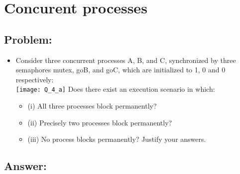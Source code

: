 \newpage
\section{Concurent processes}
\subsection{Problem:}
\begin{itemize}
    \item Consider three concurrent processes A, B, and C, synchronized by three semaphores mutex, goB, and goC, which are initialized to 1, 0 and 0 respectively: \\
        \texttt{[image: Q\_4\_a]}
        Does there exist an execution scenario in which:
        \begin{itemize}
            \item (i) All three processes block permanently?
            \item (ii) Precisely two processes block permanently?
            \item  (iii) No process blocks permanently?
            Justify your answers.
        \end{itemize}
\end{itemize}

\subsection{Answer:}
